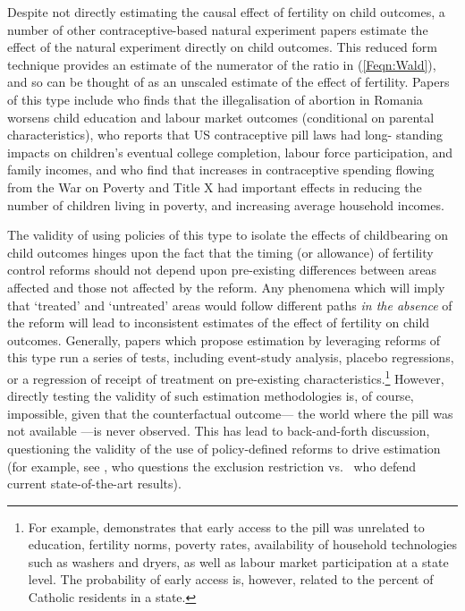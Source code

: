 \documentclass{article}
\begin{document}
\begin{spacing}{1.4}
Despite not directly estimating the causal effect of fertility on child 
outcomes, a number of other contraceptive-based natural experiment papers
estimate the effect of the natural experiment directly on child outcomes.
This reduced form technique provides an estimate of the numerator of the ratio
in (\ref{Feqn:Wald}), and so can be thought of as an unscaled estimate of
the effect of fertility.  Papers of this type include \citet{PopEleches2006} 
who finds that the illegalisation of abortion in Romania worsens child 
education and labour market outcomes (conditional on parental characteristics),
\citet{Bailey2013} who reports that US contraceptive pill laws had long-%
standing impacts on children's eventual college completion, labour force 
participation, and family incomes, and \citet{Baileyetal2016} who find that
increases in contraceptive spending flowing from the War on Poverty and Title
X had important effects in reducing the number of children living in poverty, 
and increasing average household incomes.

The validity of using policies of this type to isolate the effects of 
childbearing on child outcomes hinges upon the fact that the timing (or
allowance) of fertility control reforms should not depend upon pre-existing
differences between areas affected and those not affected by the reform. Any
phenomena which will imply that `treated' and `untreated' areas would follow
different paths \emph{in the absence} of the reform will lead to inconsistent
estimates of the effect of fertility on child outcomes.  Generally, papers
which propose estimation by leveraging reforms of this type run a series of
tests, including event-study analysis, placebo regressions, or a regression
of receipt of treatment on pre-existing characteristics.\footnote{For example,
\citet{Bailey2006} demonstrates that early access to the pill was unrelated
to education, fertility norms, poverty rates, availability of household 
technologies such as washers and dryers, as well as labour market participation
at a state level.  The probability of early access is, however, related to the
percent of Catholic residents in a state.}  However, directly testing the
validity of such estimation methodologies is, of course, impossible, given
that the counterfactual outcome--- the world where the pill was not available%
---is never observed.  This has lead to back-and-forth discussion, questioning 
the validity of the use of policy-defined reforms to drive estimation (for 
example, see \citet{Joyce2013}, who questions the exclusion restriction vs.\ 
\citet{Baileyetal2013} who defend current state-of-the-art results). 


\end{spacing}
\end{document}
